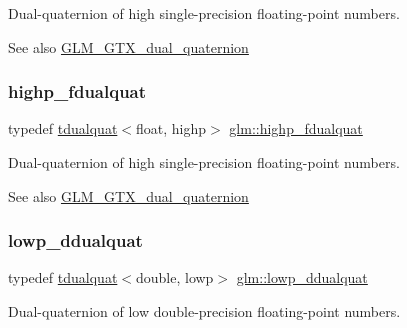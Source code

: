 Dual-\/quaternion of high single-\/precision floating-\/point numbers.

\begin{DoxySeeAlso}{See also}
\hyperlink{group__gtx__dual__quaternion}{G\+L\+M\+\_\+\+G\+T\+X\+\_\+dual\+\_\+quaternion} 
\end{DoxySeeAlso}
\mbox{\label{group__gtx__dual__quaternion_ga8c46d61c38b2b6d9c5091c667dd20fe8}} 
\subsubsection{\texorpdfstring{highp\+\_\+fdualquat}{highp\_fdualquat}}
{\footnotesize\ttfamily typedef \hyperlink{structglm_1_1tdualquat}{tdualquat}$<$float, highp$>$ \hyperlink{group__gtx__dual__quaternion_ga8c46d61c38b2b6d9c5091c667dd20fe8}{glm\+::highp\+\_\+fdualquat}}

Dual-\/quaternion of high single-\/precision floating-\/point numbers.

\begin{DoxySeeAlso}{See also}
\hyperlink{group__gtx__dual__quaternion}{G\+L\+M\+\_\+\+G\+T\+X\+\_\+dual\+\_\+quaternion} 
\end{DoxySeeAlso}
\mbox{\label{group__gtx__dual__quaternion_ga361a2ea6cce1446a8ab7e7803156c16c}} 
\subsubsection{\texorpdfstring{lowp\+\_\+ddualquat}{lowp\_ddualquat}}
{\footnotesize\ttfamily typedef \hyperlink{structglm_1_1tdualquat}{tdualquat}$<$double, lowp$>$ \hyperlink{group__gtx__dual__quaternion_ga361a2ea6cce1446a8ab7e7803156c16c}{glm\+::lowp\+\_\+ddualquat}}

Dual-\/quaternion of low double-\/precision floating-\/point numbers.

